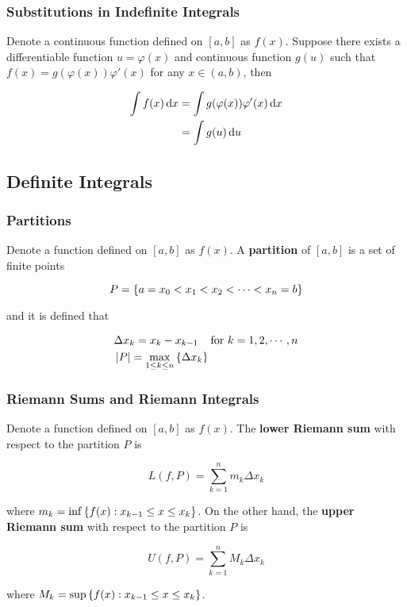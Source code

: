 \documentclass[a4paper,12pt]{article}
\begin{document}
\subsubsection{Substitutions in Indefinite Integrals}
\begin{thm}
  Denote a continuous function defined on $[a,b]$ as $f(x)$. Suppose there exists a differentiable function $u=\varphi(x)$ and continuous function $g(u)$ such that $f(x)=g(\varphi(x))\varphi'(x)$ for any $x\in(a,b)$, then

  $$\begin{aligned}[t]
    \int f(x)\,\mathrm{d} x&=\int g(\varphi(x))\varphi'(x)\,\mathrm{d} x\\
    &=\int g(u)\,\mathrm{d} u
  \end{aligned}$$
\end{thm}

\subsection{Definite Integrals}
\subsubsection{Partitions}
\begin{dft}
  Denote a function defined on $[a,b]$ as $f(x)$. A \textbf{partition} of $[a,b]$ is a set of finite points

  $$P=\left\{ a=x_{0}<x_{1}<x_{2}<\cdots<x_{n}=b\right\}$$

  and it is defined that

  $$\begin{aligned}[t]
    &\Delta x_{k}=x_{k}-x_{k-1}\;\;\;\;\text{for }k=1,2,\cdots,n\\
    &\left| P\right|=\underset{1\leq k\leq n}{\max}\left\{ \Delta x_{k}\right\}
  \end{aligned}$$
\end{dft}

\subsubsection{Riemann Sums and Riemann Integrals}
\begin{dft}
  Denote a function defined on $[a,b]$ as $f(x)$. The \textbf{lower Riemann sum} with respect to the partition $P$ is

  $$L(f,P)=\sum_{k=1}^{n}m_{k}\Delta x_{k}$$\s

  where $m_{k}=\inf\left\{ f(x):x_{k-1}\leq x\leq x_{k}\right\}$. On the other hand, the \textbf{upper Riemann sum} with respect to the partition $P$ is

  $$U(f,P)=\sum_{k=1}^{n}M_{k}\Delta x_{k}$$\s

  where $M_{k}=\sup\left\{ f(x):x_{k-1}\leq x\leq x_{k}\right\}$.\n
\end{dft}
\end{document}
